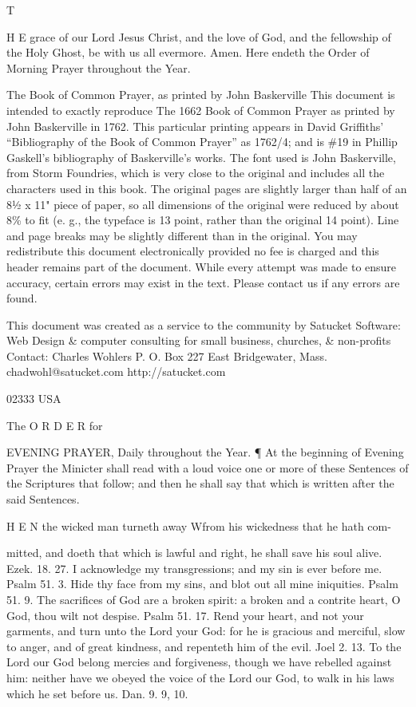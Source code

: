 T

H E grace of our Lord Jesus Christ, and the love of God, and the fellowship of the Holy Ghost, be with us all evermore. Amen. Here endeth the Order of Morning Prayer throughout the Year.


The Book of Common Prayer, as printed by John Baskerville This document is intended to exactly reproduce The 1662 Book of Common Prayer as printed by John Baskerville in 1762. This particular printing appears in David Griffiths' “Bibliography of the Book of Common Prayer” as 1762/4; and is \#19 in Phillip Gaskell's bibliography of Baskerville's works. The font used is John Baskerville, from Storm Foundries, which is very close to the original and includes all the characters used in this book. The original pages are slightly larger than half of an 8½ x 11" piece of paper, so all dimensions of the original were reduced by about 8\% to fit (e. g., the typeface is 13 point, rather than the original 14 point). Line and page breaks may be slightly different than in the original. You may redistribute this document electronically provided no fee is charged and this header remains part of the document. While every attempt was made to ensure accuracy, certain errors may exist in the text. Please contact us if any errors are found.

This document was created as a service to the community by Satucket Software: Web Design \& computer consulting for small business, churches, \& non-profits Contact: Charles Wohlers P. O. Box 227 East Bridgewater, Mass. chadwohl@satucket.com http://satucket.com

02333 USA

The O R D E R for

EVENING PRAYER, Daily throughout the Year. ¶ At the beginning of Evening Prayer the Minicter shall read with a loud voice one or more of these Sentences of the Scriptures that follow; and then he shall say that which is written after the said Sentences.

H E N the wicked man turneth away Wfrom his wickedness that he hath com-

mitted, and doeth that which is lawful and right, he shall save his soul alive. Ezek. 18. 27. I acknowledge my transgressions; and my sin is ever before me. Psalm 51. 3. Hide thy face from my sins, and blot out all mine iniquities. Psalm 51. 9. The sacrifices of God are a broken spirit: a broken and a contrite heart, O God, thou wilt not despise. Psalm 51. 17. Rend your heart, and not your garments, and turn unto the Lord your God: for he is gracious and merciful, slow to anger, and of great kindness, and repenteth him of the evil. Joel 2. 13. To the Lord our God belong mercies and forgiveness, though we have rebelled against him: neither have we obeyed the voice of the Lord our God, to walk in his laws which he set before us. Dan. 9. 9, 10.

